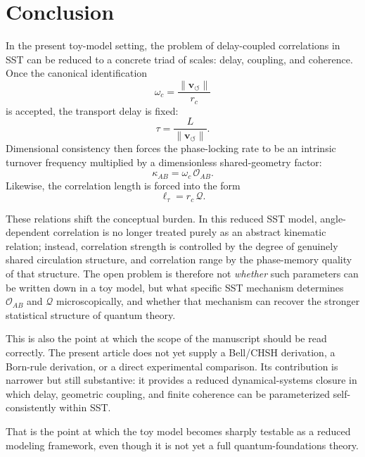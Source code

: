 \documentclass[11pt]{article}
\newcommand{\vnorm}{\lVert \mathbf{v}_{\!\boldsymbol{\circlearrowleft}}\rVert}
\newcommand{\rc}{r_c}
\begin{document}
    \section{Conclusion}
        
        In the present toy-model setting, the problem of delay-coupled correlations in SST can be reduced to a concrete triad of scales: delay, coupling, and coherence. Once the canonical identification
        \[
            \omega_c=\frac{\vnorm}{\rc}
        \]
        is accepted, the transport delay is fixed:
        \[
            \tau=\frac{L}{\vnorm}.
        \]
        Dimensional consistency then forces the phase-locking rate to be an intrinsic turnover frequency multiplied by a dimensionless shared-geometry factor:
        \[
            \kappa_{AB}=\omega_c\,\mathcal{O}_{AB}.
        \]
        Likewise, the correlation length is forced into the form
        \[
            \ell_\tau=\rc\,\mathcal{Q}.
        \]
        
        These relations shift the conceptual burden. In this reduced SST model, angle-dependent correlation is no longer treated purely as an abstract kinematic relation; instead, correlation strength is controlled by the degree of genuinely shared circulation structure, and correlation range by the phase-memory quality of that structure. The open problem is therefore not \emph{whether} such parameters can be written down in a toy model, but what specific SST mechanism determines \(\mathcal{O}_{AB}\) and \(\mathcal{Q}\) microscopically, and whether that mechanism can recover the stronger statistical structure of quantum theory.
        
        This is also the point at which the scope of the manuscript should be read correctly. The present article does not yet supply a Bell/CHSH derivation, a Born-rule derivation, or a direct experimental comparison. Its contribution is narrower but still substantive: it provides a reduced dynamical-systems closure in which delay, geometric coupling, and finite coherence can be parameterized self-consistently within SST.

        That is the point at which the toy model becomes sharply testable as a reduced modeling framework, even though it is not yet a full quantum-foundations theory.
            
\end{document}
